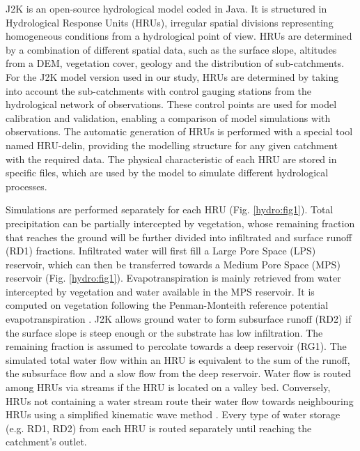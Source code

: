 J2K is an open-source hydrological model coded in Java. It is structured in Hydrological Response Units (HRUs), irregular spatial divisions representing homogeneous conditions from a hydrological point of view. HRUs are determined by a combination of different spatial data, such as the surface slope, altitudes from a DEM, vegetation cover, geology and the distribution of sub-catchments. For the J2K model version used in our study, HRUs are determined by taking into account the sub-catchments with control gauging stations from the hydrological network of observations. These control points are used for model calibration and validation, enabling a comparison of model simulations with observations. The automatic generation of HRUs is performed with a special tool named HRU-delin, providing the modelling structure for any given catchment with the required data. The physical characteristic of each HRU are stored in specific files, which are used by the model to simulate different hydrological processes. 

Simulations are performed separately for each HRU (Fig. \ref{hydro:fig1}). Total precipitation can be partially intercepted by vegetation, whose remaining fraction that reaches the ground will be further divided into infiltrated and surface runoff (RD1) fractions. Infiltrated water will first fill a Large Pore Space (LPS) reservoir, which can then be transferred towards a Medium Pore Space (MPS) reservoir (Fig. \ref{hydro:fig1}). Evapotranspiration is mainly retrieved from water intercepted by vegetation and water available in the MPS reservoir. It is computed on vegetation following the Penman-Monteith reference potential evapotranspiration \citep{howell_penman-monteith_2004}. J2K allows ground water to form subsurface runoff (RD2) if the surface slope is steep enough or the substrate has low infiltration. The remaining fraction is assumed to percolate towards a deep reservoir (RG1). The simulated total water flow within an HRU is equivalent to the sum of the runoff, the subsurface flow and a slow flow from the deep reservoir. Water flow is routed among HRUs via streams if the HRU is located on a valley bed. Conversely, HRUs not containing a water stream route their water flow towards neighbouring HRUs using a simplified kinematic wave method \citep{chen_surface_1970}. Every type of water storage (e.g. RD1, RD2) from each HRU is routed separately until reaching the catchment's outlet. 

